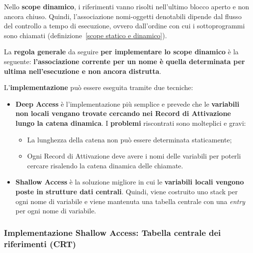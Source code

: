 \documentclass[a4paper]{article}
\begin{document}
	Nello \textbf{scope dinamico}, i riferimenti vanno risolti nell'ultimo blocco aperto e non ancora chiuso. Quindi, l'associazione nomi-oggetti denotabili dipende dal flusso del controllo a tempo di esecuzione, ovvero dall'ordine con cui i sottoprogrammi sono chiamati (definizione~\ref{scope statico e dinamico}).\newline
	
	\noindent
	La \textbf{regola generale} da seguire \textbf{per implementare lo scope dinamico} è la seguente: \textbf{l'associazione corrente per un nome è quella determinata per ultima nell'esecuzione e non ancora distrutta}.\newline
	
	\noindent
	L'\textbf{implementazione} può essere eseguita tramite due tecniche:
	\begin{itemize}
		\item \textcolor{Red3}{\textbf{Deep Access}} è l'implementazione più semplice e prevede che le \textbf{variabili non locali vengano trovate cercando nei Record di Attivazione lungo la catena dinamica}.\newline
		I \textbf{problemi} riscontrati sono molteplici e gravi:
		\begin{itemize}
			\item La lunghezza della catena non può essere determinata staticamente;
			\item Ogni Record di Attivazione deve avere i nomi delle variabili per poterli cercare risalendo la catena dinamica delle chiamate.
		\end{itemize}
		
		\item \textcolor{Red3}{\textbf{Shallow Access}} è la soluzione migliore in cui le \textbf{variabili locali vengono poste in strutture dati centrali}. Quindi, viene costruito uno stack per ogni nome di variabile e viene mantenuta una tabella centrale con una \emph{entry} per ogni nome di variabile.
	\end{itemize}\newpage
	
	\subsubsection{Implementazione Shallow Access: Tabella centrale dei riferimenti (CRT)}
	
\end{document}
